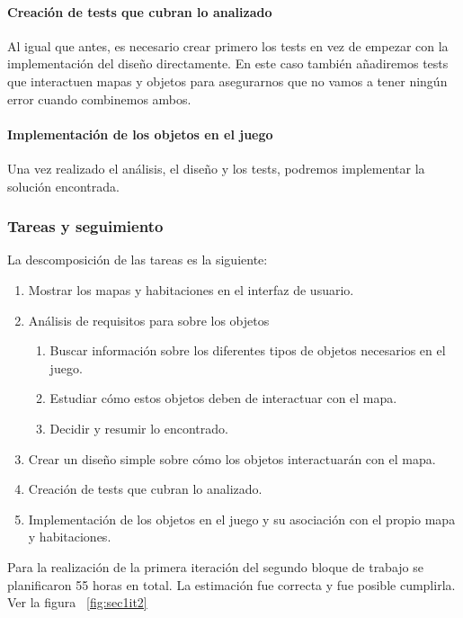 \paragraph{Creación de tests que cubran lo analizado} Al igual que antes, es necesario crear primero los tests en vez de empezar con la implementación del diseño directamente. En este caso también añadiremos tests que interactuen mapas y objetos para asegurarnos que no vamos a tener ningún error cuando combinemos ambos.

\paragraph{Implementación de los objetos en el juego} Una vez realizado el análisis, el diseño y los tests, podremos implementar la solución encontrada.

\subsubsection{Tareas y seguimiento}

La descomposición de las tareas es la siguiente:

\begin{enumerate}[label=\bfseries WBS 1.\arabic*]
  \item Mostrar los mapas y habitaciones en el interfaz de usuario.
  \item Análisis de requisitos para sobre los objetos
    \begin{enumerate}[label=\bfseries WBS 1.1.\arabic*]
      \item Buscar información sobre los diferentes tipos de objetos necesarios en el juego.
      \item Estudiar cómo estos objetos deben de interactuar con el mapa.
      \item Decidir y resumir lo encontrado.
    \end{enumerate}
  \item Crear un diseño simple sobre cómo los objetos interactuarán con el mapa.
  \item Creación de tests que cubran lo analizado.
  \item Implementación de los objetos en el juego y su asociación con el propio mapa y habitaciones.
\end{enumerate}

Para la realización de la primera iteración del segundo bloque de trabajo se planificaron 55 horas en total. La estimación fue correcta y fue posible cumplirla. Ver la figura ~\ref{fig:sec1it2}

